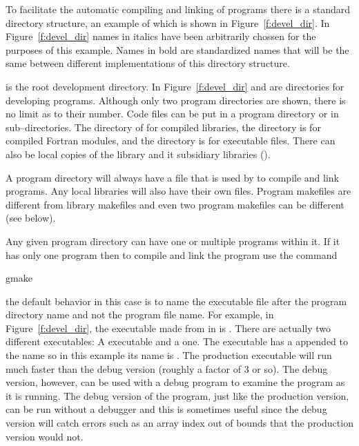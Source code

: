 To facilitate the automatic compiling and linking of programs there is
a standard directory structure, an example of which is shown in
Figure~\ref{f:devel_dir}. In Figure~\ref{f:devel_dir} names in italics
have been arbitrarily chossen for the purposes of this example. Names
in bold are standardized names that will be the same between different
implementations of this directory structure.

 is the root development directory.  In
Figure~\ref{f:devel_dir}  and 
are directories for developing programs. Although only two program
directories are shown, there is no limit as to their number. Code
files can be put in a program directory or in sub--directories. The
 directory of for compiled libraries, the 
directory is for compiled Fortran modules, and the  directory
is for executable files. There can also be local copies of the
 library and it subsidiary libraries ().

A program directory will always have a  file that is used
by  to compile and link programs. Any local libraries will
also have their own  files. Program makefiles are
different from library makefiles and even two program makefiles can 
be different (see below).

Any given program directory can have one or multiple programs within
it. If it has only one program then to compile and link the program
use the command
\begin{example}
  gmake
\end{example}
the default  behavior in this case is to name the executable
file after the program directory name and not the program file
name. For example, in Figure~\ref{f:devel_dir}, the executable made
from  in  is
. There are actually two different executables:
A  executable and a  one. The 
executable has a  appended to the name so in this example its
name is .  The production executable will run
much faster than the debug version (roughly a factor of 3 or so). The
debug version, however, can be used with a debug program to examine
the program as it is running.  The debug version of the program, just
like the production version, can be run without a debugger and this is
sometimes useful since the debug version will catch errors such as an
array index out of bounds that the production version would not.

